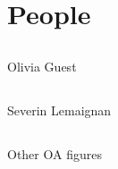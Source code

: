 \section{People}



\subsection{}
{


\begin{frame}{Olivia Guest}
    \begin{figure}
	
   \end{figure}
	
\end{frame}
}




\subsection{}
{


\begin{frame}{Severin Lemaignan} 
    \begin{figure}
	
   \end{figure}
	
\end{frame}
}






\subsection{}
{

\begin{frame}{Other OA figures} 
    \begin{figure}
	
   \end{figure}
	
\end{frame}
}




